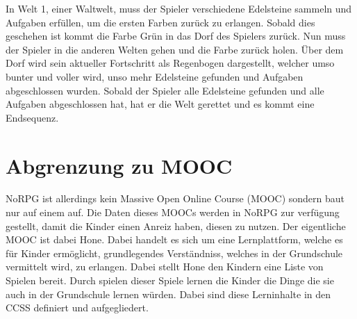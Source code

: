 In Welt 1, einer Waltwelt, muss der Spieler verschiedene Edelsteine sammeln und Aufgaben erfüllen, um die ersten Farben zurück zu erlangen. Sobald dies geschehen ist kommt die Farbe Grün in das Dorf des Spielers zurück. Nun muss der Spieler in die anderen Welten gehen und die Farbe zurück holen. Über dem Dorf wird sein aktueller Fortschritt als Regenbogen dargestellt, welcher umso bunter und voller wird, unso mehr Edelsteine gefunden und Aufgaben abgeschlossen wurden. Sobald der Spieler alle Edelsteine gefunden und alle Aufgaben abgeschlossen hat, hat er die Welt gerettet und es kommt eine Endsequenz.
	
\section{Abgrenzung zu MOOC}

NoRPG ist allerdings kein Massive Open Online Course (MOOC) sondern baut nur auf einem auf. Die Daten dieses MOOCs werden in NoRPG zur verfügung gestellt, damit die Kinder einen Anreiz haben, diesen zu nutzen. Der eigentliche MOOC ist dabei Hone. Dabei handelt es sich um eine Lernplattform, welche es für Kinder ermöglicht, grundlegendes Verständniss, welches in der Grundschule vermittelt wird, zu erlangen. Dabei stellt Hone den Kindern eine Liste von Spielen bereit. Durch spielen dieser Spiele lernen die Kinder die Dinge die sie auch in der Grundschule lernen würden. Dabei sind diese Lerninhalte in den CCSS definiert und aufgegliedert.
